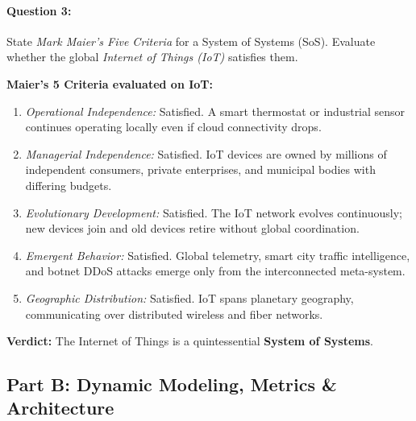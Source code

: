 \paragraph{Question 3:} State \textit{Mark Maier's Five Criteria} for a System of Systems (SoS). Evaluate whether the global \textit{Internet of Things (IoT)} satisfies them.
\vspace{0.3em}
\begin{tcolorbox}[colback=white,colframe=seSecondary,title={\small \textbf{Model Solution to Question 3:}}]
\textbf{Maier's 5 Criteria evaluated on IoT:}
\begin{enumerate}[leftmargin=1.5em, itemsep=1pt]
    \item \textit{Operational Independence:} Satisfied. A smart thermostat or industrial sensor continues operating locally even if cloud connectivity drops.
    \item \textit{Managerial Independence:} Satisfied. IoT devices are owned by millions of independent consumers, private enterprises, and municipal bodies with differing budgets.
    \item \textit{Evolutionary Development:} Satisfied. The IoT network evolves continuously; new devices join and old devices retire without global coordination.
    \item \textit{Emergent Behavior:} Satisfied. Global telemetry, smart city traffic intelligence, and botnet DDoS attacks emerge only from the interconnected meta-system.
    \item \textit{Geographic Distribution:} Satisfied. IoT spans planetary geography, communicating over distributed wireless and fiber networks.
\end{enumerate}
\textbf{Verdict:} The Internet of Things is a quintessential \textbf{System of Systems}.
\end{tcolorbox}

\subsection{Part B: Dynamic Modeling, Metrics \& Architecture}

